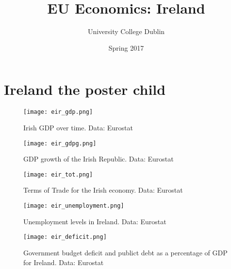 \documentclass{tufte-handout}
\title{EU Economics: Ireland}
\author{University College Dublin}
\date{Spring 2017}
\begin{document}
\maketitle  
\section{Ireland the poster child}
\begin{figure} \centering
    \texttt{[image: eir\_gdp.png]}
    \caption{Irish GDP over time. Data: Eurostat}
    \label{fig:eir1}
  \end{figure}

\begin{figure} \centering
    \texttt{[image: eir\_gdpg.png]}
    \caption{GDP growth of the Irish Republic. Data: Eurostat}
    \label{fig:eir2}
  \end{figure}

\begin{figure} \centering
    \texttt{[image: eir\_tot.png]}
    \caption{Terms of Trade for the Irish economy. Data: Eurostat}
    \label{fig:eir3}
  \end{figure}

\begin{figure} \centering
    \texttt{[image: eir\_unemployment.png]}
    \caption{Unemployment levels in Ireland. Data: Eurostat}
    \label{fig:eir4}
  \end{figure}


\begin{figure} \centering
    \texttt{[image: eir\_deficit.png]}
    \caption{Government budget deficit and publict debt as a percentage of GDP for Ireland. Data: Eurostat}
    \label{fig:eir5}
  \end{figure}

\end{document}
